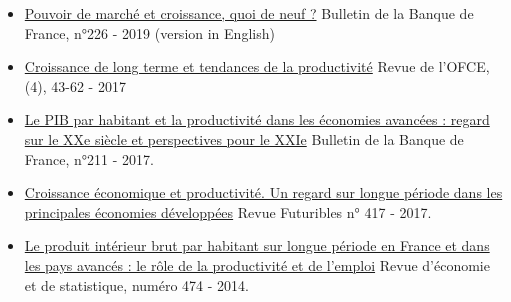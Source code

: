 \documentclass[12pt]{article}
\begin{document}
\begin{itemize}
\item \href{https://publications.banque-france.fr/pouvoir-de-marche-et-croissance-quoi-de-neuf}{Pouvoir de marché et croissance, quoi de neuf ?} Bulletin de la Banque de France, n°226 - 2019 (version in English)

\item \href{https://www.ofce.sciences-po.fr/pdf/revue/3-153.pdf}{Croissance de long terme et tendances de la productivité} Revue de l'OFCE, (4), 43-62 - 2017

\item \href{https://publications.banque-france.fr/sites/default/files/medias/documents/bdf211_mai-juin-2017_web.pdf#page=13}{Le PIB par habitant et la productivité dans les économies avancées : regard sur le XXe siècle et perspectives pour le XXIe} Bulletin de la Banque de France, n°211 - 2017.

\item \href{https://www.futuribles.com/croissance-economique-et-productivite-un-regard-su}{Croissance économique et productivité. Un regard sur longue période dans les principales économies développées} Revue Futuribles n° 417 - 2017.

\item \href{https://www.insee.fr/fr/statistiques/1377624?sommaire=1377636}{Le produit intérieur brut par habitant sur longue période en France et dans les pays avancés : le rôle de la productivité et de l'emploi} Revue d'économie et de statistique, numéro 474 - 2014.
\end{itemize}
\end{document}
